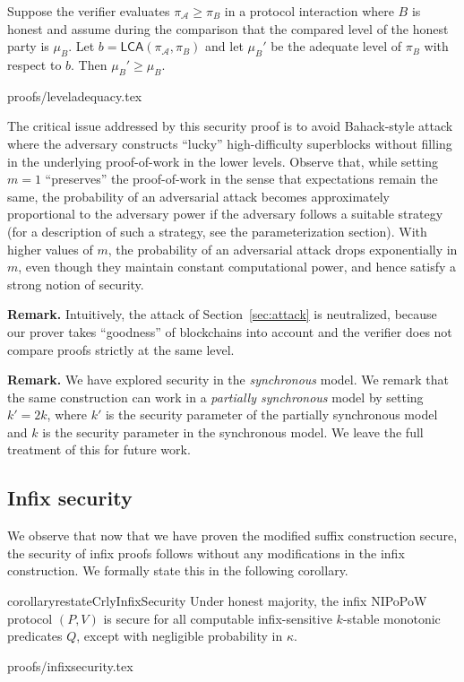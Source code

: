 \begin{lemma}
Suppose the verifier evaluates $\pi_\mathcal{A} \geq \pi_B$ in a protocol
interaction where $B$ is honest and assume during the comparison that the
compared level of the honest party is $\mu_B$. Let $b =
\textsf{LCA}(\pi_\mathcal{A}, \pi_B)$ and let $\mu_B'$ be the adequate
level of $\pi_B$ with respect to $b$. Then $\mu_B' \geq \mu_B$.
\end{lemma}
{proofs/leveladequacy.tex}


\begin{remark}
\label{rmk.variance}
The critical issue addressed by this security proof is to avoid Bahack-style
attack \cite{bahack} where the adversary constructs ``lucky'' high-difficulty
superblocks without filling in the underlying proof-of-work in the lower
levels. Observe that, while setting $m = 1$ ``preserves'' the proof-of-work in
the sense that expectations remain the same, the probability of an adversarial
attack becomes approximately proportional to the adversary power if the
adversary follows a suitable strategy (for a description of such a strategy,
see the parameterization section). With higher values of $m$, the probability of
an adversarial attack drops exponentially in $m$, even though they maintain constant
computational power, and hence satisfy a strong notion of security.
\end{remark}

\noindent\textbf{Remark.}
Intuitively, the attack of Section~\ref{sec:attack} is neutralized, because
our prover takes ``goodness'' of blockchains into account and the verifier
does not compare proofs strictly at the same level.

\noindent\textbf{Remark.}
We have explored security in the \emph{synchronous} model. We remark that the
same construction can work in a \emph{partially synchronous} model by setting
$k' = 2k$, where $k'$ is the security parameter of the partially synchronous
model and $k$ is the security parameter in the synchronous model. We leave the
full treatment of this for future work.

\subsection{Infix security}
We observe that now that we have proven the modified suffix construction secure,
the security of infix proofs follows without any modifications in the infix
construction. We formally state this in the following corollary.

\begin{restatable}{corollary}{restateCrlyInfixSecurity}
\label{crly.infix-security}
Under honest majority, the infix NIPoPoW protocol $(P, V)$ is secure for all
computable infix-sensitive $k$-stable monotonic predicates $Q$, except with
negligible probability in $\kappa$.
\end{restatable}
{proofs/infixsecurity.tex}
